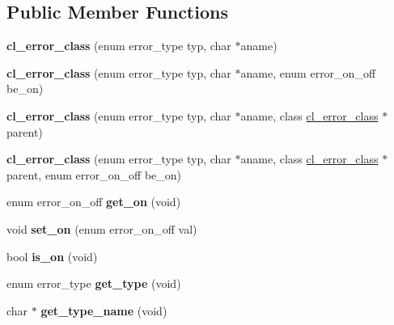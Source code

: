 \subsection*{Public Member Functions}
\begin{DoxyCompactItemize}
\item 
\hypertarget{classcl__error__class_a5d5f65aa751faed9295ae65dfa4e7a9e}{
{\bfseries cl\_\-error\_\-class} (enum error\_\-type typ, char $\ast$aname)}
\label{classcl__error__class_a5d5f65aa751faed9295ae65dfa4e7a9e}

\item 
\hypertarget{classcl__error__class_ae9236194853fde69cfe414bb1c6bc949}{
{\bfseries cl\_\-error\_\-class} (enum error\_\-type typ, char $\ast$aname, enum error\_\-on\_\-off be\_\-on)}
\label{classcl__error__class_ae9236194853fde69cfe414bb1c6bc949}

\item 
\hypertarget{classcl__error__class_adc00bc6c1fd8449a8d17f50acd35d9f5}{
{\bfseries cl\_\-error\_\-class} (enum error\_\-type typ, char $\ast$aname, class \hyperlink{classcl__error__class}{cl\_\-error\_\-class} $\ast$parent)}
\label{classcl__error__class_adc00bc6c1fd8449a8d17f50acd35d9f5}

\item 
\hypertarget{classcl__error__class_acaaf22d054293fb0b74909aa8be31290}{
{\bfseries cl\_\-error\_\-class} (enum error\_\-type typ, char $\ast$aname, class \hyperlink{classcl__error__class}{cl\_\-error\_\-class} $\ast$parent, enum error\_\-on\_\-off be\_\-on)}
\label{classcl__error__class_acaaf22d054293fb0b74909aa8be31290}

\item 
\hypertarget{classcl__error__class_a049290442ef81be14ba866f0c07d92ab}{
enum error\_\-on\_\-off {\bfseries get\_\-on} (void)}
\label{classcl__error__class_a049290442ef81be14ba866f0c07d92ab}

\item 
\hypertarget{classcl__error__class_a557020a680f757eecf9ca96eb118e8f4}{
void {\bfseries set\_\-on} (enum error\_\-on\_\-off val)}
\label{classcl__error__class_a557020a680f757eecf9ca96eb118e8f4}

\item 
\hypertarget{classcl__error__class_a3b08926a0574a8957b3b70e1ffe61ae3}{
bool {\bfseries is\_\-on} (void)}
\label{classcl__error__class_a3b08926a0574a8957b3b70e1ffe61ae3}

\item 
\hypertarget{classcl__error__class_acb9b042b5e8c868bc8e8d3774bde85cb}{
enum error\_\-type {\bfseries get\_\-type} (void)}
\label{classcl__error__class_acb9b042b5e8c868bc8e8d3774bde85cb}

\item 
\hypertarget{classcl__error__class_a02382dfc36598bc350297ce420451105}{
char $\ast$ {\bfseries get\_\-type\_\-name} (void)}
\label{classcl__error__class_a02382dfc36598bc350297ce420451105}

\end{DoxyCompactItemize}
